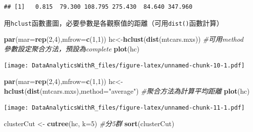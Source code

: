 \documentclass[]{book}
\newenvironment{Shaded}{\begin{snugshade}}{\end{snugshade}}
\newcommand{\CommentTok}[1]{\textcolor[rgb]{0.56,0.35,0.01}{\textit{#1}}}
\newcommand{\DataTypeTok}[1]{\textcolor[rgb]{0.13,0.29,0.53}{#1}}
\newcommand{\DecValTok}[1]{\textcolor[rgb]{0.00,0.00,0.81}{#1}}
\newcommand{\KeywordTok}[1]{\textcolor[rgb]{0.13,0.29,0.53}{\textbf{#1}}}
\newcommand{\NormalTok}[1]{#1}
\newcommand{\StringTok}[1]{\textcolor[rgb]{0.31,0.60,0.02}{#1}}
\begin{document}
\begin{verbatim}
## [1]   0.815  79.300 108.795 275.430  84.640 347.960
\end{verbatim}

用\texttt{hclust}函數畫圖，必要參數是各觀察值的距離（可用\texttt{dist()}函數計算）

\begin{Shaded}
\begin{Highlighting}[]
\KeywordTok{par}\NormalTok{(}\DataTypeTok{mar=}\KeywordTok{rep}\NormalTok{(}\DecValTok{2}\NormalTok{,}\DecValTok{4}\NormalTok{),}\DataTypeTok{mfrow=}\KeywordTok{c}\NormalTok{(}\DecValTok{1}\NormalTok{,}\DecValTok{1}\NormalTok{))}
\NormalTok{hc<-}\KeywordTok{hclust}\NormalTok{(}\KeywordTok{dist}\NormalTok{(mtcars.mxs)) }\CommentTok{#可用method參數設定聚合方法，預設為complete}
\KeywordTok{plot}\NormalTok{(hc)}
\end{Highlighting}
\end{Shaded}

\texttt{[image: DataAnalyticsWithR\_files/figure-latex/unnamed-chunk-10-1.pdf]}

\begin{Shaded}
\begin{Highlighting}[]
\KeywordTok{par}\NormalTok{(}\DataTypeTok{mar=}\KeywordTok{rep}\NormalTok{(}\DecValTok{2}\NormalTok{,}\DecValTok{4}\NormalTok{),}\DataTypeTok{mfrow=}\KeywordTok{c}\NormalTok{(}\DecValTok{1}\NormalTok{,}\DecValTok{1}\NormalTok{))}
\NormalTok{hc<-}\KeywordTok{hclust}\NormalTok{(}\KeywordTok{dist}\NormalTok{(mtcars.mxs),}\DataTypeTok{method=}\StringTok{"average"}\NormalTok{) }\CommentTok{#聚合方法為計算平均距離}
\KeywordTok{plot}\NormalTok{(hc)}
\end{Highlighting}
\end{Shaded}

\texttt{[image: DataAnalyticsWithR\_files/figure-latex/unnamed-chunk-11-1.pdf]}

\begin{Shaded}
\begin{Highlighting}[]
\NormalTok{clusterCut <-}\StringTok{ }\KeywordTok{cutree}\NormalTok{(hc, }\DataTypeTok{k=}\DecValTok{5}\NormalTok{) }\CommentTok{#分5群}
\KeywordTok{sort}\NormalTok{(clusterCut)}
\end{Highlighting}
\end{Shaded}
\end{document}
